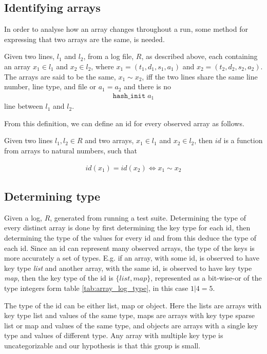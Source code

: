 \subsection{Identifying arrays}
In order to analyse how an array changes throughout a run, some method for expressing that two arrays are the same, is needed. 
\begin{definition}
Given two lines, $l_1$ and $l_2$, from a log file, $R$, as described above, each containing an array $x_1\in l_1$ and $x_2\in l_2$, where $x_1 = (t_1,d_1,s_1,a_1)$ and $x_2 = (t_2,d_2,s_2,a_2)$. The arrays are said to be the same, $x_1\sim x_2$, iff the two lines share the same line number, line type, and file or $a_1 = a_2$ and there is no 
\begin{align*}
\texttt{hash\_init}\;a_1
\end{align*}
line between $l_1$ and $l_2$.
\end{definition}
From this definition, we can define an id for every observed array as follows.
\begin{definition}
Given two lines $l_1, l_2\in R$ and two arrays, $x_1\in l_1$ and $x_2 \in l_2$, then $id$ is a function from arrays to natural numbers, such that

\begin{align*}
    id(x_1) = id(x_2) \Leftrightarrow x_1 \sim x_2
\end{align*}

\end{definition}

\subsection{Determining type}
Given a log, $R$, generated from running a test suite. Determining the type of every distinct array is done by first determining the key type for each id, then determining the type of the values for every id and from this deduce the type of each id. Since an id can represent many observed arrays, the type of the keys is more accurately a set of types. E.g. if an array, with some id, is observed to have key type \emph{list} and another array, with the same id, is observed to have key type \emph{map}, then the key type of the id is $\{list, map\}$, represented as a bit-wise-or of the type integers form table \ref{tab:array_log_type}, in this case $1 | 4 = 5$.

The type of the id can be either list, map or object. Here the lists are arrays with key type list and values of the same type, maps are arrays with key type sparse list or map and values of the same type, and objects are arrays with a single key type and values of different type. Any array with multiple key type is uncategorizable and our hypothesis is that this group is small.

